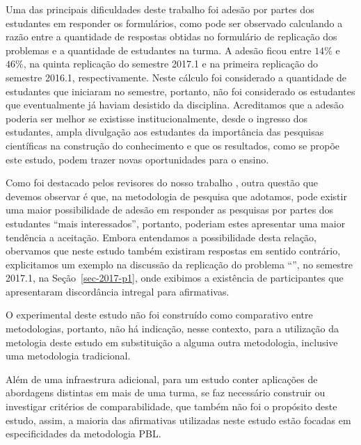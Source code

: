 Uma das principais dificuldades deste trabalho foi adesão
por partes dos estudantes em responder os formulários,
como pode ser observado calculando a razão entre
a quantidade de respostas obtidas no formulário de
replicação dos problemas e a quantidade de estudantes
na turma.
A adesão ficou entre $14\%$ e $46\%$, na
quinta replicação do semestre 2017.1 e na primeira
replicação do semestre 2016.1, respectivamente.
Neste cálculo foi considerado a quantidade de estudantes
que iniciaram no semestre, portanto, não foi considerado os
estudantes que eventualmente já haviam desistido
da disciplina.
Acreditamos que a adesão poderia ser melhor se existisse
institucionalmente, desde o ingresso dos estudantes,
ampla divulgação aos estudantes da importância das pesquisas
científicas na construção do conhecimento e que os resultados,
como se propõe este estudo, podem trazer novas oportunidades
para o ensino.

Como foi destacado pelos revisores do nosso trabalho \cite{gavaza2017},
outra questão que devemos observar é que, na metodologia de pesquisa
que adotamos, pode existir uma maior possibilidade
de adesão em responder as pesquisas por partes
dos estudantes ``mais interessados'', portanto, poderiam
estes apresentar uma maior tendência a aceitação.
Embora entendamos a possibilidade desta relação, obervamos que
neste estudo também existiram respostas em sentido
contrário, explicitamos um exemplo na discussão da
replicação do problema ``\ProblemaG'', no semestre 2017.1,
na Seção~\ref{sec-2017-p1}, onde exibimos a existência
de participantes que apresentaram discordância intregal
para afirmativas.

O experimental deste estudo não foi construído como comparativo
entre metodologias, portanto, não há indicação, nesse
contexto, para a utilização da metologia deste estudo
em substituição a alguma outra metodologia, inclusive uma
metodologia tradicional.

Além de uma infraestrura adicional, para um estudo conter
aplicações de abordagens distintas em mais de uma turma,
se faz necessário construir ou investigar critérios de
comparabilidade, que também não foi o propósito deste estudo,
assim, a maioria das afirmativas utilizadas neste estudo
estão focadas em especificidades da metodologia PBL.


